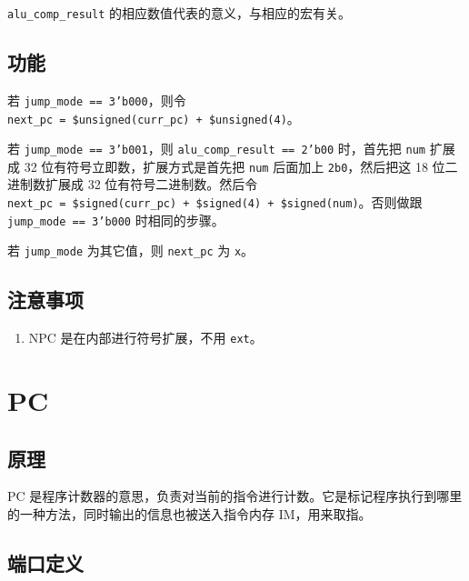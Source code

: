 \documentclass[12pt,AutoFakeBold]{article}
\providecommand{\tightlist}{%
  \setlength{\itemsep}{0pt}\setlength{\parskip}{0pt}}
\begin{document}
\texttt{alu\_comp\_result}
的相应数值代表的意义，与相应的宏有关。

\hypertarget{ux529fux80fd-1}{%
\subsection{功能}\label{ux529fux80fd-1}}

若 \texttt{jump\_mode\ == 3'b000}，则令
\texttt{next\_pc\ =\ \$unsigned(curr\_pc)\ +\ \$unsigned(4)}。

若 \texttt{jump\_mode\ == 3'b001}，则
\texttt{alu\_comp\_result\ == 2'b00} 时，首先把 \texttt{num}
扩展成 32 位有符号立即数，扩展方式是首先把 \texttt{num} 后面加上
\texttt{2\textquotesingle{}b0}，然后把这 18 位二进制数扩展成 32
位有符号二进制数。然后令
\texttt{next\_pc\ =\ \$signed(curr\_pc)\ +\ \$signed(4)\ +\ \$signed(num)}。否则做跟
\texttt{jump\_mode\ ==\ 3'b000} 时相同的步骤。

若 \texttt{jump\_mode} 为其它值，则 \texttt{next\_pc} 为 \texttt{x}。

\hypertarget{ux6ce8ux610fux4e8bux9879}{%
\subsection{注意事项}\label{ux6ce8ux610fux4e8bux9879}}

\begin{enumerate}
\def\labelenumi{\arabic{enumi}.}
\tightlist
\item
  NPC 是在内部进行符号扩展，不用 \texttt{ext}。
\end{enumerate}

\hypertarget{pc}{%
\section{PC}\label{pc}}

\hypertarget{ux539fux7406}{%
\subsection{原理}\label{ux539fux7406}}

PC 是程序计数器的意思，负责对当前的指令进行计数。它是标记程序执行到哪里的一种方法，同时输出的信息也被送入指令内存
IM，用来取指。

\hypertarget{ux7aefux53e3ux5b9aux4e49}{%
\subsection{端口定义}\label{ux7aefux53e3ux5b9aux4e49}}
\end{document}
